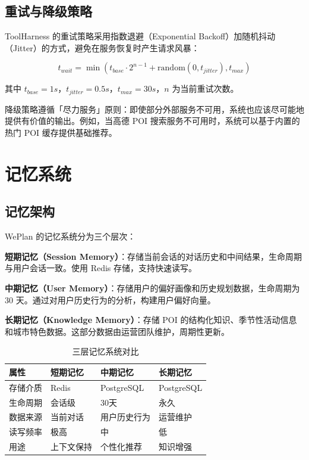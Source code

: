 \documentclass[12pt,a4paper]{ctexart}
\begin{document}
\subsection{重试与降级策略}

ToolHarness 的重试策略采用指数退避（Exponential Backoff）加随机抖动（Jitter）的方式，避免在服务恢复时产生请求风暴：

\begin{equation}
t_{wait} = \min(t_{base} \cdot 2^{n-1} + \text{random}(0, t_{jitter}), t_{max})
\end{equation}

其中 $t_{base}=1s$，$t_{jitter}=0.5s$，$t_{max}=30s$，$n$ 为当前重试次数。

降级策略遵循「尽力服务」原则：即使部分外部服务不可用，系统也应该尽可能地提供有价值的输出。例如，当高德 POI 搜索服务不可用时，系统可以基于内置的热门 POI 缓存提供基础推荐。

\newpage

\section{记忆系统}

\subsection{记忆架构}

WePlan 的记忆系统分为三个层次：

\textbf{短期记忆（Session Memory）}：存储当前会话的对话历史和中间结果，生命周期与用户会话一致。使用 Redis 存储，支持快速读写。

\textbf{中期记忆（User Memory）}：存储用户的偏好画像和历史规划数据，生命周期为 30 天。通过对用户历史行为的分析，构建用户偏好向量。

\textbf{长期记忆（Knowledge Memory）}：存储 POI 的结构化知识、季节性活动信息和城市特色数据。这部分数据由运营团队维护，周期性更新。

\begin{table}[H]
\centering
\caption{三层记忆系统对比}
\label{tab:memory-layers}
\renewcommand{\arraystretch}{1.3}
\begin{tabular}{p{3cm} p{3cm} p{3cm} p{3cm}}
\toprule
\textbf{属性} & \textbf{短期记忆} & \textbf{中期记忆} & \textbf{长期记忆} \\
\midrule
存储介质 & Redis & PostgreSQL & PostgreSQL \\
生命周期 & 会话级 & 30天 & 永久 \\
数据来源 & 当前对话 & 用户历史行为 & 运营维护 \\
读写频率 & 极高 & 中 & 低 \\
用途 & 上下文保持 & 个性化推荐 & 知识增强 \\
\bottomrule
\end{tabular}
\end{table}
\end{document}
